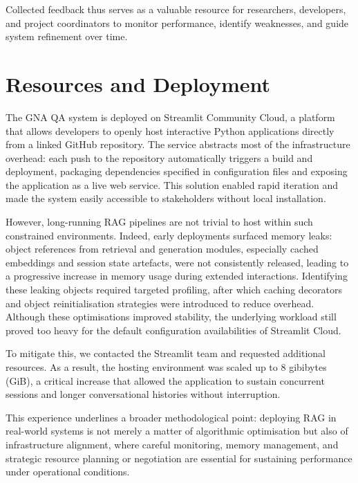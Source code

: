 \begin{spacing}{1.5}
Collected feedback thus serves as a valuable resource for researchers, developers, and project coordinators to monitor performance, identify weaknesses, and guide system refinement over time.


\section{Resources and Deployment}
The GNA QA system is deployed on Streamlit Community Cloud, a platform that allows developers to openly host interactive Python applications directly from a linked GitHub repository. The service abstracts most of the infrastructure overhead: each push to the repository automatically triggers a build and deployment, packaging dependencies specified in configuration files and exposing the application as a live web service. This solution enabled rapid iteration and made the system easily accessible to stakeholders without local installation.

However, long-running RAG pipelines are not trivial to host within such constrained environments. Indeed, early deployments surfaced memory leaks: object references from retrieval and generation modules, especially cached embeddings and session state artefacts, were not consistently released, leading to a progressive increase in memory usage during extended interactions. Identifying these leaking objects required targeted profiling, after which caching decorators and object reinitialisation strategies were introduced to reduce overhead. Although these optimisations improved stability, the underlying workload still proved too heavy for the default configuration availabilities of Streamlit Cloud.

To mitigate this, we contacted the Streamlit team and requested additional resources. As a result, the hosting environment was scaled up to 8 gibibytes (GiB), a critical increase that allowed the application to sustain concurrent sessions and longer conversational histories without interruption. 

This experience underlines a broader methodological point: deploying RAG in real-world systems is not merely a matter of algorithmic optimisation but also of infrastructure alignment, where careful monitoring, memory management, and strategic resource planning or negotiation are essential for sustaining performance under operational conditions.


\end{spacing}
